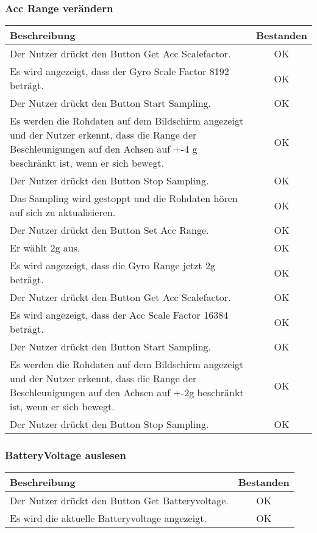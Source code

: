\documentclass[a4paper,12pt]{article}
\begin{document}
\subsubsection{Acc Range verändern}
\begin{tabular}{ | p{12cm} | c| }
	\hline
	\textbf{Beschreibung} & \textbf{Bestanden}\\
	\hline
	Der Nutzer drückt den Button \glqq{}Get Acc Scalefactor\grqq{}. & OK\\
	\hline
	Es wird angezeigt, dass der Gyro Scale Factor 8192 beträgt. & OK\\
	\hline
	Der Nutzer drückt den Button \glqq{}Start Sampling\grqq{}. & OK\\
	\hline
	Es werden die Rohdaten auf dem Bildschirm angezeigt und der Nutzer erkennt, dass die Range der Beschleunigungen auf den Achsen  auf +-4 g beschränkt ist, wenn er sich bewegt. & OK\\
	\hline
	Der Nutzer drückt den Button \glqq{}Stop Sampling\grqq{}. & OK \\
	\hline
	Das Sampling wird gestoppt und die Rohdaten hören auf sich zu aktualisieren. & OK \\
	\hline
	Der Nutzer drückt den Button \glqq{}Set Acc Range\grqq{}. & OK\\
	\hline
	Er wählt 2g aus. & OK\\
	\hline
	Es wird angezeigt, dass die Gyro Range jetzt 2g beträgt. & OK\\
	\hline
	Der Nutzer drückt den Button \glqq{}Get Acc Scalefactor\grqq{}. & OK\\
	\hline
	Es wird angezeigt, dass der Acc Scale Factor 16384 beträgt. & OK\\
	\hline
	Der Nutzer drückt den Button \glqq{}Start Sampling\grqq{}. & OK\\
	\hline
	Es werden die Rohdaten auf dem Bildschirm angezeigt und der Nutzer erkennt, dass die Range der Beschleunigungen auf den Achsen  auf +-2g beschränkt ist, wenn er sich bewegt. & OK\\
	\hline
	Der Nutzer drückt den Button \glqq{}Stop Sampling\grqq{}. & OK \\
	\hline
\end{tabular}

\subsubsection{BatteryVoltage auslesen}
\begin{tabular}{ | p{12cm} | c| }
	\hline
	\textbf{Beschreibung} & \textbf{Bestanden}\\
	\hline
	Der Nutzer drückt den Button \glqq{}Get Batteryvoltage\grqq{}. & OK\\
	\hline
	Es wird die aktuelle Batteryvoltage angezeigt. & OK\\
	\hline
\end{tabular}
\end{document}
